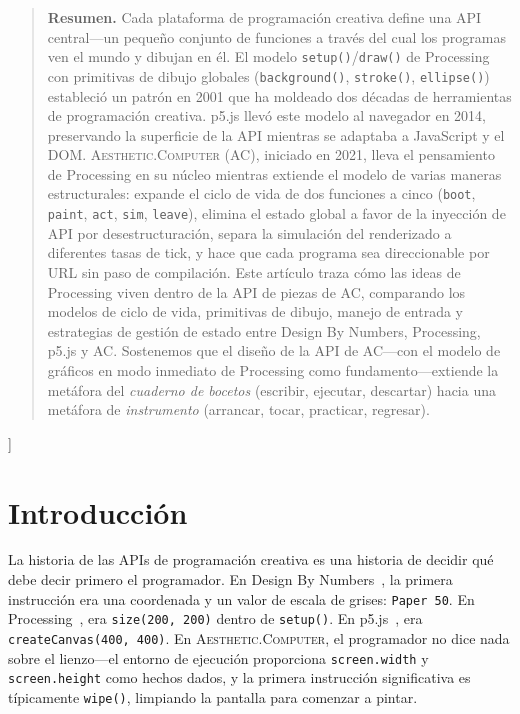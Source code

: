 \documentclass[10pt,letterpaper,twocolumn]{article}
\newcommand{\ac}{\textsc{Aesthetic.Computer}}
\begin{document}
{\begin{quote}
\small\noindent\textbf{Resumen.}
Cada plataforma de programación creativa define una API central---un pequeño conjunto de funciones a través del cual los programas ven el mundo y dibujan en él. El modelo \texttt{setup()}/\texttt{draw()} de Processing con primitivas de dibujo globales (\texttt{background()}, \texttt{stroke()}, \texttt{ellipse()}) estableció un patrón en 2001 que ha moldeado dos décadas de herramientas de programación creativa. p5.js llevó este modelo al navegador en 2014, preservando la superficie de la API mientras se adaptaba a JavaScript y el DOM. \ac{} (AC), iniciado en 2021, lleva el pensamiento de Processing en su núcleo mientras extiende el modelo de varias maneras estructurales: expande el ciclo de vida de dos funciones a cinco (\texttt{boot}, \texttt{paint}, \texttt{act}, \texttt{sim}, \texttt{leave}), elimina el estado global a favor de la inyección de API por desestructuración, separa la simulación del renderizado a diferentes tasas de tick, y hace que cada programa sea direccionable por URL sin paso de compilación. Este artículo traza cómo las ideas de Processing viven dentro de la API de piezas de AC, comparando los modelos de ciclo de vida, primitivas de dibujo, manejo de entrada y estrategias de gestión de estado entre Design By Numbers, Processing, p5.js y AC. Sostenemos que el diseño de la API de AC---con el modelo de gráficos en modo inmediato de Processing como fundamento---extiende la metáfora del \emph{cuaderno de bocetos} (escribir, ejecutar, descartar) hacia una metáfora de \emph{instrumento} (arrancar, tocar, practicar, regresar).
\end{quote}
\vspace{0.5em}
}]


\section{Introducción}

La historia de las APIs de programación creativa es una historia de decidir qué debe decir primero el programador. En Design By Numbers~\citep{maeda2001dbn}, la primera instrucción era una coordenada y un valor de escala de grises: \texttt{Paper 50}. En Processing~\citep{reas2003processing}, era \texttt{size(200, 200)} dentro de \texttt{setup()}. En p5.js~\citep{mccarthy2015p5js}, era \texttt{createCanvas(400, 400)}. En \ac{}, el programador no dice nada sobre el lienzo---el entorno de ejecución proporciona \texttt{screen.width} y \texttt{screen.height} como hechos dados, y la primera instrucción significativa es típicamente \texttt{wipe()}, limpiando la pantalla para comenzar a pintar.
\end{document}
